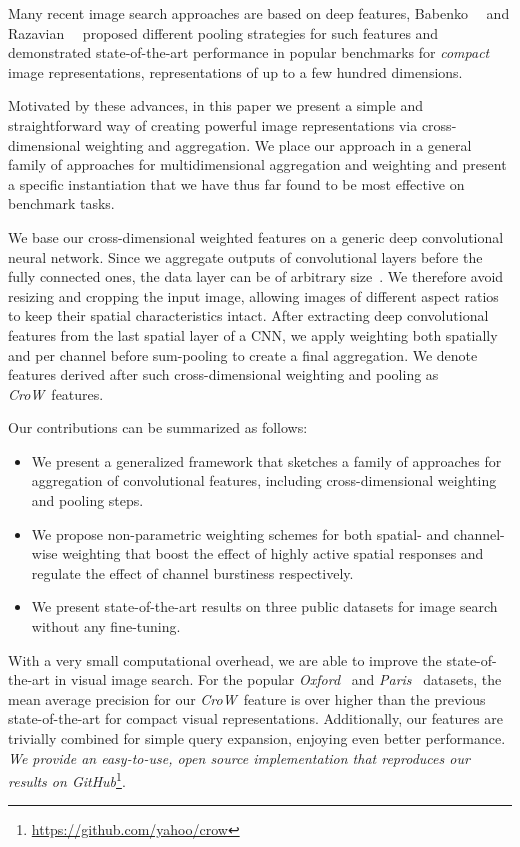 \documentclass[runningheads]{llncs}
\newcommand{\CroW}{\textit{CroW}~} \newcommand{\Crow}{\CroW}
\begin{document}
Many recent image search approaches are based on deep features, \eg Babenko~\etal~\cite{BSCL14,BaLe15} and Razavian~\etal~\cite{RASC14,ARS+14} proposed different pooling strategies for such features and demonstrated state-of-the-art performance in popular benchmarks for \textit{compact} image representations, \ie representations of up to a few hundred dimensions.

Motivated by these advances, in this paper we present a simple and straightforward way of creating powerful image representations via cross-dimensional weighting and aggregation. We place our approach in a general family of approaches for multidimensional aggregation and weighting and present a specific instantiation that we have thus far found to be most effective on benchmark tasks.


We base our cross-dimensional weighted features on a generic deep convolutional neural network. Since we aggregate outputs of convolutional layers before the fully connected ones, the data layer can be of arbitrary size~\cite{LoSD14}. We therefore avoid resizing and cropping the input image, allowing images of different aspect ratios to keep their spatial characteristics intact. After extracting deep convolutional features from the last spatial layer of a CNN, we apply weighting both spatially and per channel before sum-pooling to create a final aggregation. We denote features derived after such cross-dimensional weighting and pooling as \CroW features.



Our contributions can be summarized as follows:
\begin{itemize}
\setlength\itemsep{.01em}
\item We present a generalized framework that sketches a family of approaches for aggregation of convolutional features, including cross-dimensional weighting and pooling steps.
\item We propose non-parametric weighting schemes for both spatial- and channel-wise weighting that boost the effect of highly active spatial responses and regulate the effect of channel burstiness respectively. 
\item We present state-of-the-art results on three public datasets for image search without any fine-tuning. 
\end{itemize}

With a very small computational overhead, we are able to improve the state-of-the-art in visual image search.
For the popular \emph{Oxford}~\cite{PCI+07} and \emph{Paris}~\cite{PCS+08} datasets, the mean average precision for our \Crow feature is over  higher than the previous state-of-the-art for compact visual representations. Additionally, our features are trivially combined for simple query expansion, enjoying even better performance.
\textit{We provide an easy-to-use, open source implementation that reproduces our results on GitHub}\footnote{\url{https://github.com/yahoo/crow}}.
\end{document}
